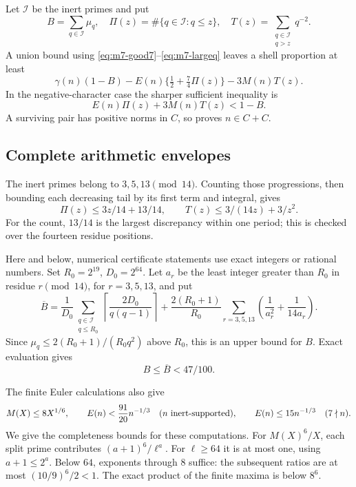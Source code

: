 Let \(\mathcal I\) be the inert primes and put
\[
 B=\sum_{q\in\mathcal I}\mu_q,\quad
 \Pi(z)=\#\{q\in\mathcal I:q\le z\},\quad
 T(z)=\sum_{\substack{q\in\mathcal I\\q>z}}q^{-2}.
\]
A union bound using \eqref{eq:m7-good7}--\eqref{eq:m7-largeq}
leaves a shell proportion at least
\begin{equation}
 \gamma(n)(1-B)
       -E(n)\{\tfrac12+\tfrac74\Pi(z)\}-3M(n)T(z).              \label{eq:m7-sieve}
\end{equation}
In the negative-character case the sharper sufficient inequality is
\begin{equation}
                  E(n)\Pi(z)+3M(n)T(z)<1-B.                  \label{eq:m7-negative}
\end{equation}
A surviving pair has positive norms in \(C\), so proves \(n\in C+C\).

\subsection{Complete arithmetic envelopes}

The inert primes belong to \(3,5,13\pmod {14}\). Counting those
progressions, then bounding each decreasing tail by its first term
and integral, gives
\begin{equation}
 \Pi(z)\le3z/14+13/14,\qquad T(z)\le3/(14z)+3/z^2.              \label{eq:m7-progression}
\end{equation}
For the count, \(13/14\) is the largest discrepancy within one
period; this is checked over the fourteen residue positions.

Here and below, numerical certificate statements use exact integers
or rational numbers. Set \(R_0=2^{19}\), \(D_0=2^{64}\).
Let \(a_r\) be the least integer greater than \(R_0\) in residue
\(r\pmod {14}\), for \(r=3,5,13\), and put
\[
 \overline B=
 \frac1{D_0}\sum_{\substack{q\in\mathcal I\\q\le R_0}}
            \left\lceil\frac{2D_0}{q(q-1)}\right\rceil
 +\frac{2(R_0+1)}{R_0}
       \sum_{r=3,5,13}\left(\frac1{a_r^2}+\frac1{14a_r}\right).
\]
Since \(\mu_q\le2(R_0+1)/(R_0q^2)\) above \(R_0\), this is an
upper bound for \(B\). Exact evaluation gives
\begin{equation}
                         B\le\overline B<47/100.               \label{eq:m7-B}
\end{equation}

The finite Euler calculations also give
\begin{equation}
 M(X)\le8X^{1/6},\qquad
 E(n)<\frac{91}{20}n^{-1/3}\quad(n\hbox{ inert-supported}),\qquad
 E(n)\le15n^{-1/3}\quad(7\nmid n).                              \label{eq:m7-Euler}
\end{equation}
We give the completeness bounds for these computations.
For \(M(X)^6/X\), each split prime contributes
\((a+1)^6/\ell^a\). For \(\ell\ge64\) it is at most one,
using \(a+1\le2^a\). Below \(64\), exponents through \(8\) suffice:
the subsequent ratios are at most \((10/9)^6/2<1\).
The exact product of the finite maxima is below \(8^6\).

